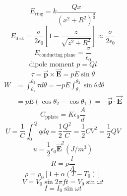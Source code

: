 \documentclass[12pt,landscape]{article}
\begin{document}
\begin{multicols}{4}
\begin{equation*}
    \end{equation*}
    \begin{equation*}
        E_{\text{ring}} = k \frac{Qx}{(x^2+R^2)^\frac{3}{2}}
    \end{equation*}
    \begin{equation*}
        E_{\text{disk}} = \frac{\sigma}{2\epsilon_0} \left[1 - \frac{z}{\sqrt{z^2 + R^2}}\right] \approx \frac{\sigma}{2\epsilon_0}
    \end{equation*}
    \begin{equation*}
        E_{\text{conducting plane}} = \frac{\sigma}{\epsilon_0}
    \end{equation*}
    \begin{equation*}
        \text{dipole moment } p = Ql
    \end{equation*}
    \begin{equation*}
        \tau = \vec{\mathbf{p}} \times \vec{\mathbf{E}} = p E \sin{\theta}
    \end{equation*}
    \begin{align*}
        W & = \int_{\theta_1}^{\theta_2} \tau d\theta = -pE \int_{\theta_1}^{\theta_2} \sin{\theta} d\theta \\
          & = p E (\cos{\theta_2} - \cos{\theta_1}) = -\vec{\mathbf{p}} \cdot \vec{\mathbf{E}}
    \end{align*}
    \begin{equation*}
        C_{\text{pplate}} = K \epsilon_0 \frac{A}{d}
    \end{equation*}
    \begin{equation*}
        U = \frac{1}{C} \int_{0}^{Q} q dq = \frac{1}{2}\frac{Q^2}{C} = \frac{1}{2} CV^2 = \frac{1}{2}QV
    \end{equation*}
    \begin{equation*}
        u = \frac{1}{2} \epsilon_0 \vec{\mathbf{E}}^2 (J / m^3)
    \end{equation*}
    \begin{equation*}
        R = \rho \frac{l}{A}
    \end{equation*}
    \begin{equation*}
        \rho = \rho_0 [1 + \alpha(T - T_0)]
    \end{equation*}
    \begin{equation*}
        V = V_0 \sin{2\pi f} t = V_0 \sin{\omega t}
    \end{equation*}
    \begin{equation*}
        I = I_0 \sin{\omega t}
    \end{equation*}

\end{multicols}
\end{document}
